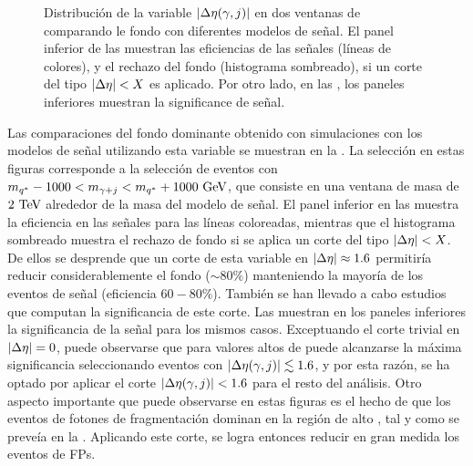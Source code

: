 \begin{figure}[ht!]
\begin{subfigure}[h]{0.49\linewidth}
    \end{subfigure}
    \caption{Distribución de la variable \(|\Delta\eta(\gamma, j)|\) en dos ventanas de \myj comparando le fondo con diferentes modelos de señal. El panel inferior de las \Figs{\ref{fig:evt_selection:sr_opt:eta:deta:1d:effrej_2000W}}{\ref{fig:evt_selection:sr_opt:eta:deta:1d:effrej_6000W}} muestran las eficiencias de las señales (l\'ineas de colores), y el rechazo del fondo (histograma sombreado), si un corte del tipo \(|\Delta\eta| < X\) es aplicado. Por otro lado, en las \Figs{\ref{fig:evt_selection:sr_opt:eta:deta:1d:SB_2000W}}{\ref{fig:evt_selection:sr_opt:eta:deta:1d:SB_6000W}}, los paneles inferiores muestran la significance de señal.}
    \label{fig:evt_selection:sr_opt:eta:deta:1d}
\end{figure}

Las comparaciones del fondo dominante obtenido con simulaciones con los modelos de señal utilizando esta variable se muestran en la \Fig{\ref{fig:evt_selection:sr_opt:eta:deta:1d}}. La selección en estas figuras corresponde a la selección de eventos con \(m_{q^*} - 1000 < m_{\gamma+j} < m_{q^*} + 1000 ~\text{GeV}\), que consiste en una ventana de masa de \(2~\text{TeV}\) alrededor de la masa del modelo de señal.
El panel inferior en las \Figs{\ref{fig:evt_selection:sr_opt:eta:deta:1d:effrej_2000W}}{\ref{fig:evt_selection:sr_opt:eta:deta:1d:effrej_6000W}} muestra la eficiencia en las señales para las líneas coloreadas, mientras que el histograma sombreado muestra el rechazo de fondo si se aplica un corte del tipo \(|\Delta\eta| < X\). De ellos se desprende que un corte de esta variable en \(|\Delta\eta| \approx 1.6\) permitiría reducir considerablemente el fondo (\(\sim 80\%\)) manteniendo la mayoría de los eventos de señal (eficiencia \(60-80\%\)).
También se han llevado a cabo estudios que computan la significancia de este corte. Las \Figs{\ref{fig:evt_selection:sr_opt:eta:deta:1d:SB_2000W}}{\ref{fig:evt_selection:sr_opt:eta:deta:1d:SB_6000W}} muestran en los paneles inferiores la significancia de la señal para los mismos casos.
Exceptuando el corte trivial en \(|\Delta\eta| = 0\), puede observarse que para valores altos de \myj puede alcanzarse la máxima significancia seleccionando eventos con \(|\Delta\eta(\gamma, j)| \lesssim 1.6\), y por esta razón, se ha optado por aplicar el corte \(|\Delta\eta(\gamma, j)| < 1.6\) para el resto del análisis.
Otro aspecto importante que puede observarse en estas figuras es el hecho de que los eventos de fotones de fragmentación dominan en la región de alto \Deta, tal y como se preveía en la \Fig{\ref{fig:evt_selection:sr_opt:eta:deta:2d:frag}}. Aplicando este corte, se logra entonces reducir en gran medida los eventos de \acp{FP}.


